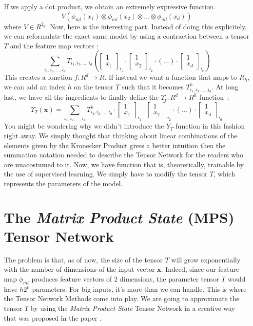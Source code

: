 \documentclass{article}
\theoremstyle{definition}
\theoremstyle{definition}
\begin{document}
If we apply a dot product, we obtain an extremely expressive function.
\[
    V 
    \left(\phi_{ml}(x_1) \otimes \phi_{ml}(x_2)\otimes \dots \otimes \phi_{ml}(x_d) \right)
\]
where $V \in R^{2_d}$.
Now, here is the interesting part. Instead of doing this explicitely, we can reformulate the exact same model by using a contraction between a tensor $T$ and the feature map vectors : 
\[
    \sum_{i_1, i_2, \dots, i_d} T_{i_1, i_2, \dots, i_d}
    \left(
    \begin{bmatrix}
        1 \\ x_1
    \end{bmatrix}_{i_1}
    \cdot
    \begin{bmatrix}
        1 \\ x_2
    \end{bmatrix}_{i_2}
    \cdot
    (\dots)
    \cdot
    \begin{bmatrix}
        1 \\ x_d
    \end{bmatrix}_{i_e}
    \right)
\]
This creates a fonction $f: R^d \to R$. If instead we want a function that maps to $R_h$, we can add an index $h$ on the tensor $T$ such that it becomes $T^{h}_{i_1, i_2, \dots, i_d}$. At long last, we have all the ingredients to finally define the $\Upsilon_t :  R^d \to R^h$ function~:
\[
    \Upsilon_T(\mathbf{x}) =     \sum_{i_1, i_2, \dots, i_d} T^{h}_{i_1, i_2, \dots, i_d}
    \cdot
    \begin{bmatrix}
        1 \\ x_1
    \end{bmatrix}_{i_1}
    \cdot
    \begin{bmatrix}
        1 \\ x_2
    \end{bmatrix}_{i_2}
    \cdot
    (\dots)
    \cdot
    \begin{bmatrix}
        1 \\ x_d
    \end{bmatrix}_{i_d}
\]
You might be wondering why we didn't introduce the $Y_T$ function in this fashion right away. We simply thought that thinking about linear combinations of the elements given by the Kronecker Product gives a better intuition then the summation notation needed to describe the Tensor Network for the readers who are unacostumed to it. Now, we have function that is, theoretically, trainable by the use of supervised learning. We simply have to modify the tensor $T$, which represents the parameters of the model.

\section{The \emph{Matrix Product State} (MPS) Tensor Network}
The problem is that, as of now, the size of the tensor $T$ will grow exponentially with the number of dimensions of the input vector $\mathbf{x}$. Indeed, since our feature map $\phi_{ml}$ produces feature vectors of $2$ dimensions, the parameter tensor $T$ would have $h2^p$ parameters. For big inputs, it's more than we can handle. This is where the Tensor Network Methods come into play. We are going to approximate the tensor $T$ by using the \emph{Matrix Product State} Tensor Network in a creative way that was proposed in the paper \cite{stoudenmire2017supervised}.
\end{document}

